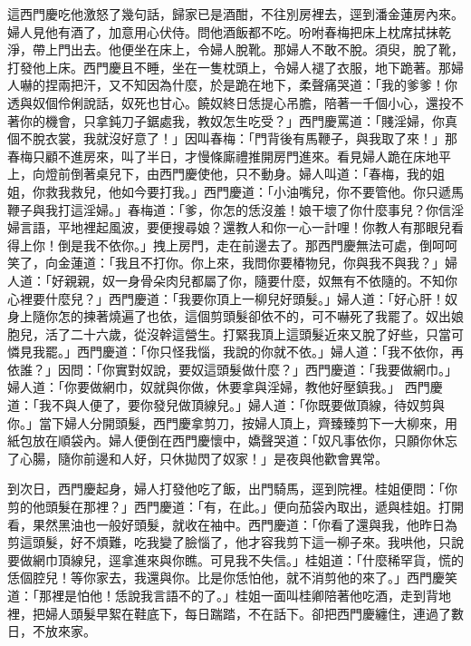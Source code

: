 這西門慶吃他激怒了幾句話，歸家已是酒酣，不往別房裡去，逕到潘金蓮房內來。婦人見他有酒了，加意用心伏侍。問他酒飯都不吃。吩咐春梅把床上枕席拭抹乾淨，帶上門出去。他便坐在床上，令婦人脫靴。那婦人不敢不脫。須臾，脫了靴，打發他上床。西門慶且不睡，坐在一隻枕頭上，令婦人褪了衣服，地下跪著。那婦人嚇的捏兩把汗，又不知因為什麼，於是跪在地下，柔聲痛哭道：「我的爹爹！你透與奴個伶俐說話，奴死也甘心。饒奴終日恁提心吊膽，陪著一千個小心，還投不著你的機會，只拿鈍刀子鋸處我，教奴怎生吃受？」西門慶罵道：「賤淫婦，你真個不脫衣裳，我就沒好意了！」因叫春梅：「門背後有馬鞭子，與我取了來！」那春梅只顧不進房來，叫了半日，才慢條廝禮推開房門進來。看見婦人跪在床地平上，向燈前倒著桌兒下，由西門慶使他，只不動身。婦人叫道：「春梅，我的姐姐，你救我救兒，他如今要打我。」西門慶道：「小油嘴兒，你不要管他。你只遞馬鞭子與我打這淫婦。」春梅道：「爹，你怎的恁沒羞！娘干壞了你什麼事兒？你信淫婦言語，平地裡起風波，要便搜尋娘？還教人和你一心一計哩！你教人有那眼兒看得上你！倒是我不依你。」拽上房門，走在前邊去了。那西門慶無法可處，倒呵呵笑了，向金蓮道：「我且不打你。你上來，我問你要椿物兒，你與我不與我？」婦人道：「好親親，奴一身骨朵肉兒都屬了你，隨要什麼，奴無有不依隨的。不知你心裡要什麼兒？」西門慶道：「我要你頂上一柳兒好頭髮。」婦人道：「好心肝！奴身上隨你怎的揀著燒遍了也依，這個剪頭髮卻依不的，可不嚇死了我罷了。奴出娘胞兒，活了二十六歲，從沒幹這營生。打緊我頂上這頭髮近來又脫了好些，只當可憐見我罷。」西門慶道：「你只怪我惱，我說的你就不依。」婦人道：「我不依你，再依誰？」因問：「你實對奴說，要奴這頭髮做什麼？」西門慶道：「我要做網巾。」婦人道：「你要做網巾，奴就與你做，休要拿與淫婦，教他好壓鎮我。」 西門慶道：「我不與人便了，要你發兒做頂線兒。」婦人道：「你既要做頂線，待奴剪與你。」當下婦人分開頭髮，西門慶拿剪刀，按婦人頂上，齊臻臻剪下一大柳來，用紙包放在順袋內。婦人便倒在西門慶懷中，嬌聲哭道：「奴凡事依你，只願你休忘了心腸，隨你前邊和人好，只休拋閃了奴家！」是夜與他歡會異常。

到次日，西門慶起身，婦人打發他吃了飯，出門騎馬，逕到院裡。桂姐便問：「你剪的他頭髮在那裡？」西門慶道：「有，在此。」便向茄袋內取出，遞與桂姐。打開看，果然黑油也一般好頭髮，就收在袖中。西門慶道：「你看了還與我，他昨日為剪這頭髮，好不煩難，吃我變了臉惱了，他才容我剪下這一柳子來。我哄他，只說要做網巾頂線兒，逕拿進來與你瞧。可見我不失信。」桂姐道：「什麼稀罕貨，慌的恁個腔兒！等你家去，我還與你。比是你恁怕他，就不消剪他的來了。」西門慶笑道：「那裡是怕他！恁說我言語不的了。」桂姐一面叫桂卿陪著他吃酒，走到背地裡，把婦人頭髮早絮在鞋底下，每日踹踏，不在話下。卻把西門慶纏住，連過了數日，不放來家。


